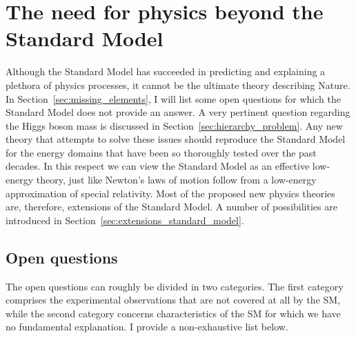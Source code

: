 \chapter{The need for physics beyond the Standard Model
\label{chap:beyond_standard_model}}

Although the Standard Model has succeeded in predicting and explaining a plethora of physics
processes, it cannot be the ultimate theory describing Nature. In
Section~\ref{sec:missing_elements}, I will list some open questions for which the Standard Model
does not provide an answer. A very pertinent question regarding the Higgs boson mass is discussed
in Section~\ref{sec:hierarchy_problem}.
Any new theory that attempts to solve these issues should reproduce
the Standard Model for the energy domains that have been so thoroughly tested over the past
decades. In this respect we can view the Standard Model as an effective low-energy theory, just
like Newton's laws of motion follow from a low-energy approximation of special relativity. 
Most of the proposed new physics theories are, therefore, extensions of the Standard Model. 
A number of possibilities are introduced in Section~\ref{sec:extensions_standard_model}.

\section{Open questions \label{sec:missing_elements}}

The open questions can roughly be divided in two categories. The first category comprises the
experimental observations that are not covered at all by the SM, while the second category concerns
characteristics of the SM for which we have no fundamental explanation. 
I provide a non-exhaustive list below.

